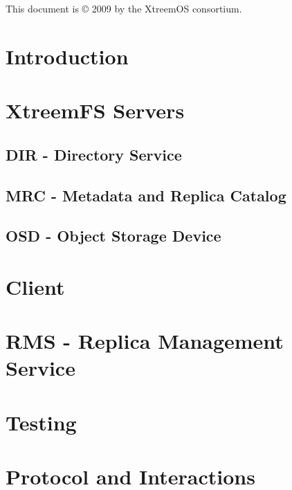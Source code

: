 \documentclass[twoside,a4paper,12pt]{book}
\begin{document}
This document is \copyright{} 2009 by the XtreemOS consortium.

\setcounter{tocdepth}{10}
\tableofcontents

\chapter{Introduction}
\label{sec:xtreemfs_intro}


\chapter{XtreemFS Servers}
\label{sec:xtreemfs_servers}


\section{DIR - Directory Service}
\label{sec:xtreemfs_dir}


\section{MRC - Metadata and Replica Catalog}
\label{sec:xtreemfs_mrc}


\section{OSD - Object Storage Device}
\label{sec:xtreemfs_osd}


\chapter{Client}
\label{sec:xtreemfs_client}


\chapter{RMS - Replica Management Service}
\label{sec:xtreemfs_rms}


\chapter{Testing}
\label{sec:xtreemfs_test}


\chapter{Protocol and Interactions}
\label{sec:xtreemfs_proto}


\printindex



\end{document}
